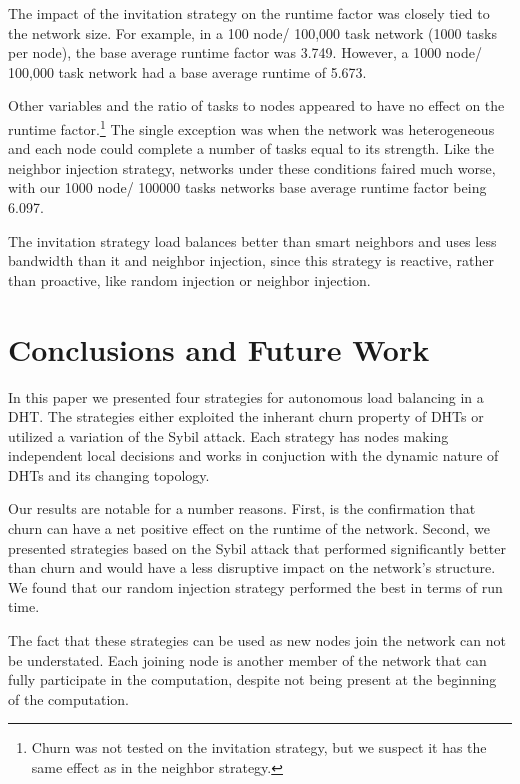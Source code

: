 \documentclass[10pt,conference]{IEEEtran}
\begin{document}
	
	
	The impact of the invitation strategy on the runtime factor was closely tied to the network size.
	For example, in a 100 node/ 100,000 task network (1000 tasks per node), the base average runtime factor was 3.749.
	However, a 1000 node/ 100,000 task network had a base average runtime of 5.673.
	
	Other variables and the ratio of tasks to nodes appeared to have no effect on the runtime factor.\footnote{Churn was not tested on the invitation strategy, but we suspect it has the same effect as in the neighbor strategy.}
	The single exception was when the network was heterogeneous and each node could complete a number of tasks equal to its strength.
	Like the neighbor injection strategy, networks under these conditions faired much worse, with our 1000 node/ 100000 tasks networks base average runtime factor being 6.097.
	
	The invitation strategy load balances better than smart neighbors and uses less bandwidth than it and neighbor injection, since this strategy is reactive, rather than proactive, like random injection or neighbor injection.
	
	\section{Conclusions and Future Work}
	In this paper we presented four strategies for autonomous load balancing in a DHT. 
	The strategies either exploited the inherant churn property of DHTs or utilized a variation of the Sybil attack. 
	Each strategy has nodes making independent local decisions and works in conjuction with the dynamic nature of DHTs and its changing topology.
	
	Our results are notable for a number reasons.
	First, is the confirmation that churn can have a net positive effect on the runtime of the network.
	Second, we presented strategies based on the Sybil attack that performed significantly better than churn and would have a less disruptive impact on the network's structure.
	We found that our random injection strategy performed the best in terms of run time.
	
	
	The fact that these strategies can be used as new nodes join the network can not be understated.
	Each joining node is another member of the network that can fully participate in the computation, despite not being present at the beginning of the computation.
	
\end{document}

